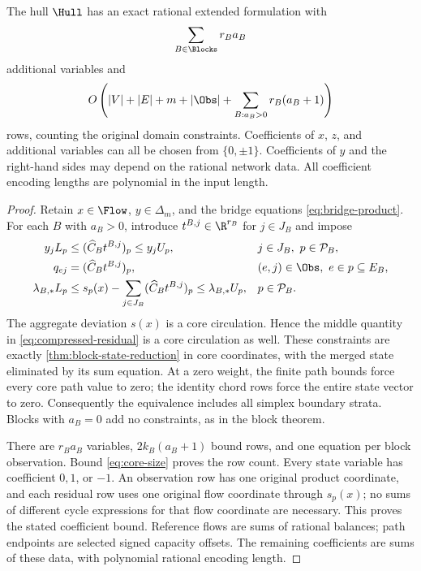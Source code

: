 \begin{theorem}\label{thm:cycle-compression}
The hull $\Hull$ has an exact rational extended formulation with
\begin{equation}\label{eq:initial-variable-count}
 \sum_{B\in\Blocks}r_Ba_B
\end{equation}
additional variables and
\begin{equation}\label{eq:compression-row-count}
 O\left(|V|+|E|+m+|\Obs|
       +\sum_{B:a_B>0}r_B(a_B+1)\right)
\end{equation}
rows, counting the original domain constraints. Coefficients of $x$, $z$,
and additional variables can all be chosen from $\{0,\pm1\}$. Coefficients
of $y$ and the right-hand sides may depend on the rational network data.
All coefficient encoding lengths are polynomial in the input length.
\end{theorem}
\begin{proof}
Retain $x\in\Flow$, $y\in\Delta_m$, and the bridge equations
\eqref{eq:bridge-product}. For each $B$ with $a_B>0$, introduce
$t^{B,j}\in\R^{r_B}$ for $j\in J_B$ and impose
\begin{align}
 y_jL_p&\le(\widehat C_Bt^{B,j})_p\le y_jU_p,
       &&j\in J_B,\ p\in\mathcal P_B,\label{eq:compressed-state}\\
 q_{ej}&=(\widehat C_Bt^{B,j})_p,
       &&(e,j)\in\Obs,\ e\in p\subseteq E_B,\label{eq:compressed-observation}\\
 \lambda_{B,*}L_p&\le s_p(x)-\sum_{j\in J_B}
                      (\widehat C_Bt^{B,j})_p
                    \le\lambda_{B,*}U_p,
       &&p\in\mathcal P_B.\label{eq:compressed-residual}
\end{align}
The aggregate deviation $s(x)$ is a core circulation. Hence the middle
quantity in \eqref{eq:compressed-residual} is a core circulation as well.
These constraints are exactly \cref{thm:block-state-reduction} in core
coordinates, with the merged state eliminated by its sum equation.
At a zero weight, the finite path bounds force every core path value to
zero; the identity chord rows force the entire state vector to zero.
Consequently the equivalence includes all simplex boundary strata. Blocks
with $a_B=0$ add no constraints, as in the block theorem.

There are $r_Ba_B$ variables, $2k_B(a_B+1)$ bound rows, and one equation
per block observation. Bound \eqref{eq:core-size} proves the row count.
Every state variable has coefficient $0,1$, or $-1$. An observation row
has one original product coordinate, and each residual row uses one
original flow coordinate through $s_p(x)$; no sums of different cycle
expressions for that flow coordinate are necessary. This proves the stated
coefficient bound. Reference flows are sums of rational balances; path
endpoints are selected signed capacity offsets. The remaining coefficients
are sums of these data, with polynomial rational encoding length.
\end{proof}

